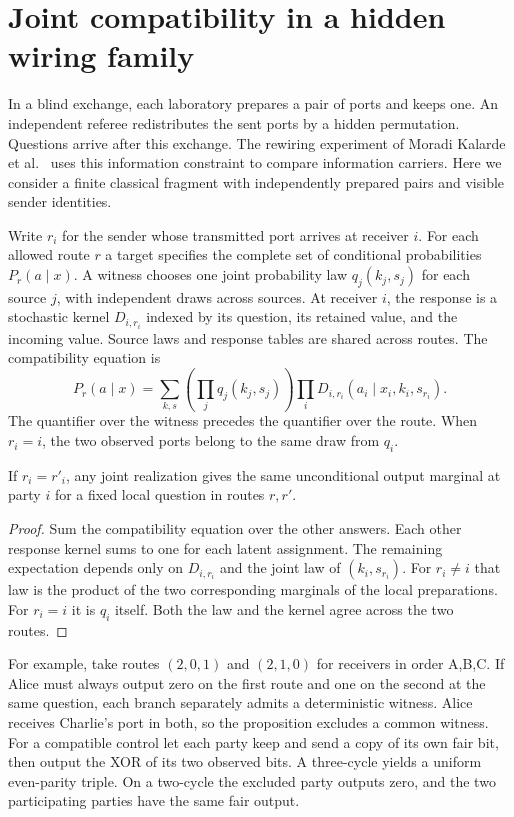 \section{Joint compatibility in a hidden wiring family}

In a blind exchange, each laboratory prepares a pair of ports and keeps one.
An independent referee redistributes the sent ports by a hidden permutation.
Questions arrive after this exchange. The rewiring experiment of
Moradi Kalarde et al.~\cite{kalarde2026fermions} uses this information constraint
to compare information carriers. Here we consider a finite classical fragment
with independently prepared pairs and visible sender identities.

Write $r_i$ for the sender whose transmitted port arrives at receiver $i$.
For each allowed route $r$ a target specifies the complete set of conditional
probabilities $P_r(a\mid x)$. A witness chooses one joint probability law
$q_j(k_j,s_j)$ for each source $j$, with independent draws across sources.
At receiver $i$, the response is a stochastic kernel $D_{i,r_i}$ indexed by
its question, its retained value, and the incoming value. Source laws and
response tables are shared across routes. The compatibility equation is
\[
 P_r(a\mid x)=
 \sum_{k,s}\left(\prod_j q_j(k_j,s_j)\right)
             \prod_i D_{i,r_i}(a_i\mid x_i,k_i,s_{r_i}) .
\]
The quantifier over the witness precedes the quantifier over the route.
When $r_i=i$, the two observed ports belong to the same draw from $q_i$.

\begin{proposition}
If $r_i=r'_i$, any joint realization gives the same unconditional output
marginal at party $i$ for a fixed local question in routes $r,r'$.
\end{proposition}
\begin{proof}
Sum the compatibility equation over the other answers. Each other response
kernel sums to one for each latent assignment. The remaining expectation
depends only on $D_{i,r_i}$ and the joint law of $(k_i,s_{r_i})$. For
$r_i\ne i$ that law is the product of the two corresponding marginals of the
local preparations. For $r_i=i$ it is $q_i$ itself. Both the law and the
kernel agree across the two routes.
\end{proof}

For example, take routes $(2,0,1)$ and $(2,1,0)$ for receivers in order A,B,C.
If Alice must always output zero on the first route and one on the second at
the same question, each branch separately admits a deterministic witness.
Alice receives Charlie's port in both, so the proposition excludes a common
witness. For a compatible control let each party keep and send a copy of its
own fair bit, then output the XOR of its two observed bits. A three-cycle
yields a uniform even-parity triple. On a two-cycle the excluded party outputs
zero, and the two participating parties have the same fair output.

